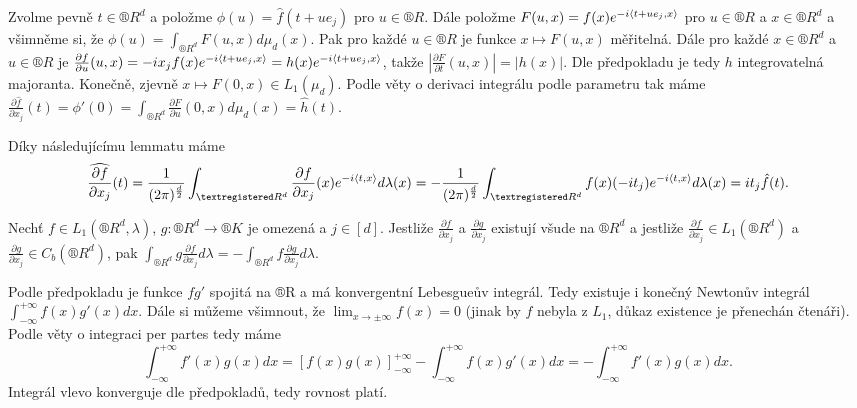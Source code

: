 \documentclass[12pt]{article}					%
\begin{document}
\begin{veta}
	\begin{dukazin}[7.]
		Zvolme pevně $t \in ®R^d$ a položme $\phi(u) = \hat{f}(t + u e_j)$ pro $u \in ®R$. Dále položme $F(u, x) = f(x) e^{-i \left\langle t + ue_j, x\right\rangle}$ pro $u \in ®R$ a $x \in ®R^d$ a všimněme si, že $\phi(u) = \int_{®R^d} F(u, x) d\mu_d(x)$. Pak pro každé $u \in ®R$ je funkce $x \mapsto F(u, x)$ měřitelná. Dále pro každé $x \in ®R^d$ a $u \in ®R$ je $\frac{\partial f}{\partial u}(u, x) = -i x_j f(x) e^{-i \left\langle t + u e_j, x\right\rangle} = h(x) e^{-i \left\langle t + ue_j, x\right\rangle}$, takže $\left|\frac{\partial F}{\partial t}(u, x)\right| = |h(x)|$. Dle předpokladu je tedy $h$ integrovatelná majoranta. Konečně, zjevně $x \mapsto F(0, x) \in L_1(\mu_d)$. Podle věty o derivaci integrálu podle parametru tak máme $\frac{\partial \hat{f}}{\partial x_j}(t) = \phi'(0) = \int_{®R^d} \frac{\partial F}{\partial u}(0, x) d\mu_d(x) = \hat{h}(t)$.
	\end{dukazin}

	\begin{dukazin}[8.]
		Díky následujícímu lemmatu máme
		$$ \widehat{\frac{\partial f}{\partial x_j}}(t) = \frac{1}{(2\pi)^{\frac{d}{2}}} \int_{®R^d} \frac{\partial f}{\partial x_j}(x) e^{-i \<t, x\>} d\lambda(x) = -\frac{1}{(2\pi)^{\frac{d}{2}}} \int_{®R^d} f(x) (-i t_j) e^{-i \<t, x\>} d\lambda(x) = i t_j \hat{f}(t). $$
	\end{dukazin}
\end{veta}

\begin{lemma}
	Nechť $f \in L_1(®R^d, \lambda)$, $g: ®R^d \rightarrow ®K$ je omezená a $j \in [d]$. Jestliže $\frac{\partial f}{\partial x_j}$ a $\frac{\partial g}{\partial x_j}$ existují všude na $®R^d$ a jestliže $\frac{\partial f}{\partial x_j} \in L_1(®R^d)$ a $\frac{\partial g}{\partial x_j} \in C_b(®R^d)$, pak $\int_{®R^d} g \frac{\partial f}{\partial x_j} d\lambda = -\int_{®R^d} f \frac{\partial g}{\partial x_j} d\lambda$.

	\begin{dukazin}[Náznak pro $d=1$]
		Podle předpokladu je funkce $f g'$ spojitá na ®R a má konvergentní Lebesgueův integrál. Tedy existuje i konečný Newtonův integrál $\int_{-∞}^{+∞} f(x) g'(x) dx$. Dále si můžeme všimnout, že $\lim_{x \rightarrow ±∞} f(x) = 0$ (jinak by $f$ nebyla z $L_1$, důkaz existence je přenechán čtenáři). Podle věty o integraci per partes tedy máme
		$$ \int_{-∞}^{+∞} f'(x) g(x) dx = [f(x)g(x)]_{-∞}^{+∞} - \int_{-∞}^{+∞} f(x) g'(x) dx = -\int_{-∞}^{+∞} f'(x) g(x) dx. $$
		Integrál vlevo konverguje dle předpokladů, tedy rovnost platí.
	\end{dukazin}
\end{lemma}
\end{document}
